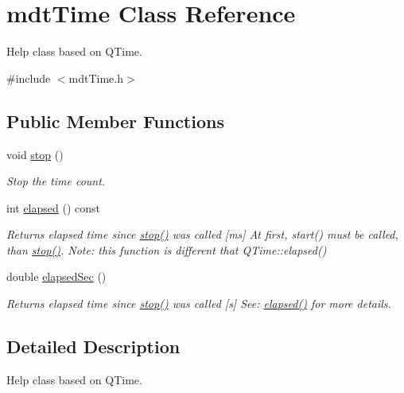 \hypertarget{classmdt_time}{
\section{mdtTime Class Reference}
\label{classmdt_time}
}


Help class based on QTime.  




{\ttfamily \#include $<$mdtTime.h$>$}

\subsection*{Public Member Functions}
\begin{DoxyCompactItemize}
\item 
\hypertarget{classmdt_time_aa833a5d3857b988caec2b35b035801a6}{
void \hyperlink{classmdt_time_aa833a5d3857b988caec2b35b035801a6}{stop} ()}
\label{classmdt_time_aa833a5d3857b988caec2b35b035801a6}

\begin{DoxyCompactList}\small\item\em Stop the time count. \end{DoxyCompactList}\item 
int \hyperlink{classmdt_time_abbd22fa3b8a33b8c82e0544c20c41af1}{elapsed} () const 
\begin{DoxyCompactList}\small\item\em Returns elapsed time since \hyperlink{classmdt_time_aa833a5d3857b988caec2b35b035801a6}{stop()} was called \mbox{[}ms\mbox{]} At first, start() must be called, than \hyperlink{classmdt_time_aa833a5d3857b988caec2b35b035801a6}{stop()}. Note: this function is different that QTime::elapsed() \end{DoxyCompactList}\item 
double \hyperlink{classmdt_time_aabd78c0447eea8a95a9fd88adc4cb6a0}{elapsedSec} ()
\begin{DoxyCompactList}\small\item\em Returns elapsed time since \hyperlink{classmdt_time_aa833a5d3857b988caec2b35b035801a6}{stop()} was called \mbox{[}s\mbox{]} See: \hyperlink{classmdt_time_abbd22fa3b8a33b8c82e0544c20c41af1}{elapsed()} for more details. \end{DoxyCompactList}\end{DoxyCompactItemize}


\subsection{Detailed Description}
Help class based on QTime. 

